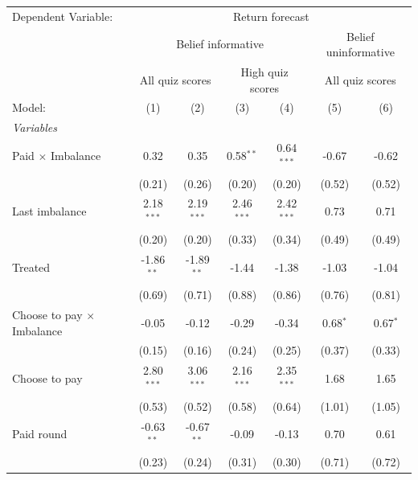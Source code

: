 \begingroup
\centering
\begin{tabular}{lcccccc}
   \tabularnewline \midrule \midrule
   Dependent Variable: & \multicolumn{6}{c}{Return forecast}\\
    & \multicolumn{4}{c}{Belief informative} & \multicolumn{2}{c}{Belief uninformative} \\ 
    & \multicolumn{2}{c}{All quiz scores} & \multicolumn{2}{c}{High quiz scores} & \multicolumn{2}{c}{All quiz scores} \\ 
   Model:                            & (1)          & (2)          & (3)          & (4)          & (5)           & (6)\\  
   \midrule
   \emph{Variables}\\
   Paid $\times$ Imbalance           & 0.32         & 0.35         & 0.58$^{**}$  & 0.64$^{***}$ & -0.67         & -0.62\\   
                                     & (0.21)       & (0.26)       & (0.20)       & (0.20)       & (0.52)        & (0.52)\\   
   Last imbalance                    & 2.18$^{***}$ & 2.19$^{***}$ & 2.46$^{***}$ & 2.42$^{***}$ & 0.73          & 0.71\\   
                                     & (0.20)       & (0.20)       & (0.33)       & (0.34)       & (0.49)        & (0.49)\\   
   Treated                           & -1.86$^{**}$ & -1.89$^{**}$ & -1.44        & -1.38        & -1.03         & -1.04\\   
                                     & (0.69)       & (0.71)       & (0.88)       & (0.86)       & (0.76)        & (0.81)\\   
   Choose to pay $\times$ Imbalance  & -0.05        & -0.12        & -0.29        & -0.34        & 0.68$^{*}$    & 0.67$^{*}$\\   
                                     & (0.15)       & (0.16)       & (0.24)       & (0.25)       & (0.37)        & (0.33)\\   
   Choose to pay                     & 2.80$^{***}$ & 3.06$^{***}$ & 2.16$^{***}$ & 2.35$^{***}$ & 1.68          & 1.65\\   
                                     & (0.53)       & (0.52)       & (0.58)       & (0.64)       & (1.01)        & (1.05)\\   
   Paid round                        & -0.63$^{**}$ & -0.67$^{**}$ & -0.09        & -0.13        & 0.70          & 0.61\\   
                                     & (0.23)       & (0.24)       & (0.31)       & (0.30)       & (0.71)        & (0.72)\\   

\end{tabular}
